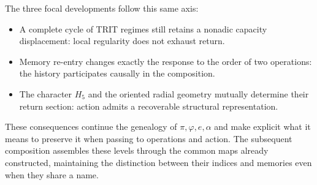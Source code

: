 The three focal developments follow this same axis:
\begin{itemize}
 \item A complete cycle of TRIT regimes still retains a
 nonadic capacity displacement: local regularity does not exhaust
 return.
 \item Memory re-entry changes exactly the response to the order
 of two operations: the history participates causally in the composition.
 \item The character $H_5$ and the oriented radial geometry mutually
 determine their return section: action admits a recoverable
 structural representation.
\end{itemize}
These consequences continue the genealogy of $\pi,\varphi,e,\alpha$ and
make explicit what it means to preserve it when passing to operations and
action. The subsequent composition assembles these levels through the
common maps already constructed, maintaining the distinction between their indices and
memories even when they share a name.
